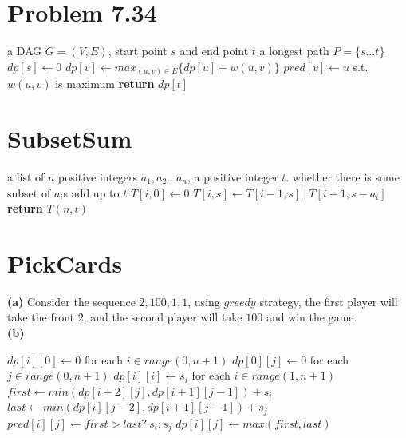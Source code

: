 \documentclass[a4paper]{article}
\begin{document}
\begin{spacing}{1.3}
\section*{Problem 7.34}
\begin{algorithmic}[1]
\Require a DAG $G=(V,E)$, start point $s$ and end point $t$
\Ensure a longest path $P=\{s\ldots t\}$
\State {}
\State $dp[s]\gets 0$
\State $dp[v]\gets max_{(u,v)\in E}\{dp[u]+w(u,v)\}$
\State $pred[v]\gets u$ s.t. $w(u,v)$ is maximum 
\EndFor
\State \textbf{return} $dp[t]$
\end{algorithmic}

\section*{SubsetSum}
\begin{algorithmic}[1]
\Require a list of $n$ positive integers $a_1,a_2\ldots a_n$, a positive integer $t$.
\Ensure whether there is some subset of $a_i$s add up to $t$
\State $T[i,0]\gets 0$
\EndFor
{}
\State $T[i,s]\gets T[i-1,s]\ |\ T[i-1,s-a_i]$
\EndFor
\EndFor
\State \textbf{return} $T(n,t)$
\end{algorithmic}

\section*{PickCards}
\textbf{(a)} Consider the sequence $2,100,1,1$, using $greedy$ strategy, the first player will take the front $2$, and the second player will take $100$ and win the game. 
\\\textbf{(b)}
\begin{algorithmic}[1]
\State $dp[i][0]\gets 0$ for each $i\in range(0,n+1)$
\State $dp[0][j]\gets 0$ for each $j\in range(0,n+1)$
\State $dp[i][i]\gets s_i$ for each $i\in range(1,n+1)$
\State $first\gets min(dp[i+2][j],dp[i+1][j-1])+s_i$
\State $last\gets min(dp[i][j-2],dp[i+1][j-1])+s_j$
\State $pred[i][j]\gets first>last?\ s_i:s_j$
\State $dp[i][j]\gets max(first,last)$
\EndFor
\EndFor{}

\end{algorithmic}
\end{spacing}
\end{document}

